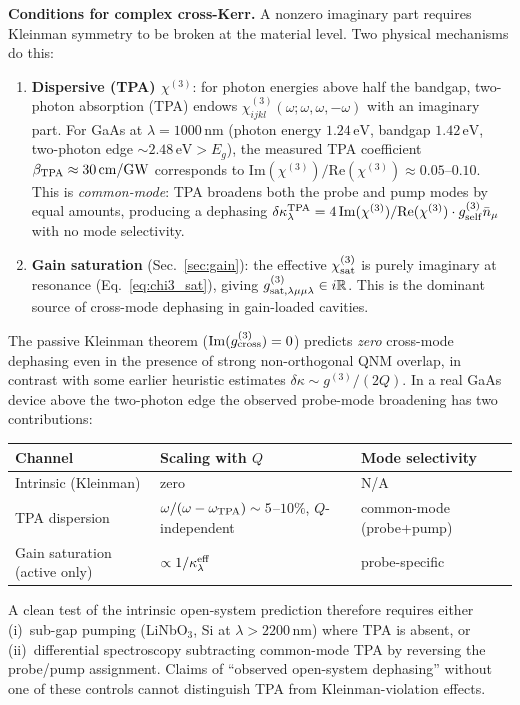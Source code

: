 \documentclass[12pt]{article}
\begin{document}
\textbf{Conditions for complex cross-Kerr.}
A nonzero imaginary part requires Kleinman symmetry to be broken at the
material level.  Two physical mechanisms do this:
\begin{enumerate}
  \item \textbf{Dispersive (TPA) $\chi^{(3)}$}: for photon energies
    above half the bandgap, two-photon absorption (TPA) endows
    $\chi^{(3)}_{ijkl}(\omega;\omega,\omega,-\omega)$ with an imaginary
    part.  For GaAs at $\lambda=1000\,\mathrm{nm}$ (photon energy
    $1.24\,\mathrm{eV}$, bandgap $1.42\,\mathrm{eV}$, two-photon edge
    $\sim 2.48\,\mathrm{eV}>E_g$), the measured TPA coefficient
    $\beta_{\rm TPA}\approx 30\,\mathrm{cm/GW}$ \cite{Hurlbut2007}
    corresponds to
    $\mathrm{Im}(\chi^{(3)})/\mathrm{Re}(\chi^{(3)})\approx 0.05$--$0.10$.
    This is \emph{common-mode}: TPA broadens both the probe and pump
    modes by equal amounts, producing a dephasing
    $\delta\kappa^{\rm TPA}_\lambda
    =4\,\mathrm{Im}(\chi^{(3)})/\mathrm{Re}(\chi^{(3)})
    \cdot g^{(3)}_{\rm self}\bar{n}_\mu$ with no mode selectivity.

  \item \textbf{Gain saturation} (Sec.~\ref{sec:gain}): the effective
    $\chi^{(3)}_{\rm sat}$ is purely imaginary at resonance
    (Eq.~\ref{eq:chi3_sat}), giving
    $g^{(3)}_{\rm sat,\lambda\mu\mu\lambda}\in i\mathbb{R}$.  This is
    the dominant source of cross-mode dephasing in gain-loaded cavities.
\end{enumerate}

\begin{remark}
The passive Kleinman theorem ($\mathrm{Im}(g^{(3)}_{\rm cross})=0$)
predicts \emph{zero} cross-mode dephasing even in the presence of
strong non-orthogonal QNM overlap, in contrast with some earlier
heuristic estimates $\delta\kappa\sim g^{(3)}/(2Q)$.  In a real GaAs
device above the two-photon edge the observed probe-mode broadening
has two contributions:
\begin{center}
\begin{tabular}{lll}
\toprule
Channel & Scaling with $Q$ & Mode selectivity \\
\midrule
Intrinsic (Kleinman) & zero &  N/A \\
TPA dispersion & $\omega/(\omega-\omega_{\rm TPA})\sim 5$--$10\%$, $Q$-independent
  & common-mode (probe+pump) \\
Gain saturation (active only) & $\propto 1/\kappa_\lambda^{\rm eff}$
  & probe-specific \\
\bottomrule
\end{tabular}
\end{center}
A clean test of the intrinsic open-system prediction therefore requires
either (i)~sub-gap pumping (LiNbO$_3$, Si at $\lambda>2200\,\mathrm{nm}$)
where TPA is absent, or (ii)~differential spectroscopy subtracting
common-mode TPA by reversing the probe/pump assignment.  Claims of
``observed open-system dephasing'' without one of these controls
cannot distinguish TPA from Kleinman-violation effects.
\end{remark}
\end{document}
